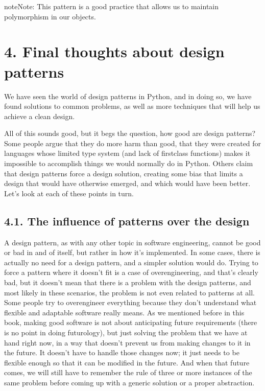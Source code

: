 \documentclass[a4paper,10pt,english]{sphinxmanual}
\begin{document}
\begin{sphinxadmonition}{note}{Note:}
This pattern is a good practice that allows us to maintain polymorphism in our objects.
\end{sphinxadmonition}


\section{4. Final thoughts about design patterns}
\label{\detokenize{chapters/9_design_patterns/index:final-thoughts-about-design-patterns}}
We have seen the world of design patterns in Python, and in doing so, we have found
solutions to common problems, as well as more techniques that will help us achieve a clean
design.

All of this sounds good, but it begs the question, how good are design patterns? Some
people argue that they do more harm than good, that they were created for languages
whose limited type system (and lack of first\sphinxhyphen{}class functions) makes it impossible to
accomplish things we would normally do in Python. Others claim that design patterns
force a design solution, creating some bias that limits a design that would have otherwise
emerged, and which would have been better. Let’s look at each of these points in turn.


\subsection{4.1. The influence of patterns over the design}
\label{\detokenize{chapters/9_design_patterns/index:the-influence-of-patterns-over-the-design}}
A design pattern, as with any other topic in software engineering, cannot be good or bad
in and of itself, but rather in how it’s implemented. In some cases, there is actually no need
for a design pattern, and a simpler solution would do. Trying to force a pattern where it
doesn’t fit is a case of over\sphinxhyphen{}engineering, and that’s clearly bad, but it doesn’t mean that there
is a problem with the design patterns, and most likely in these scenarios, the problem is not
even related to patterns at all. Some people try to over\sphinxhyphen{}engineer everything because they
don’t understand what flexible and adaptable software really means. As we mentioned
before in this book, making good software is not about anticipating future requirements
(there is no point in doing futurology), but just solving the problem that we have at
hand right now, in a way that doesn’t prevent us from making changes to it in the future. It
doesn’t have to handle those changes now; it just needs to be flexible enough so that it can
be modified in the future. And when that future comes, we will still have to remember the
rule of three or more instances of the same problem before coming up with a generic
solution or a proper abstraction.
\end{document}
